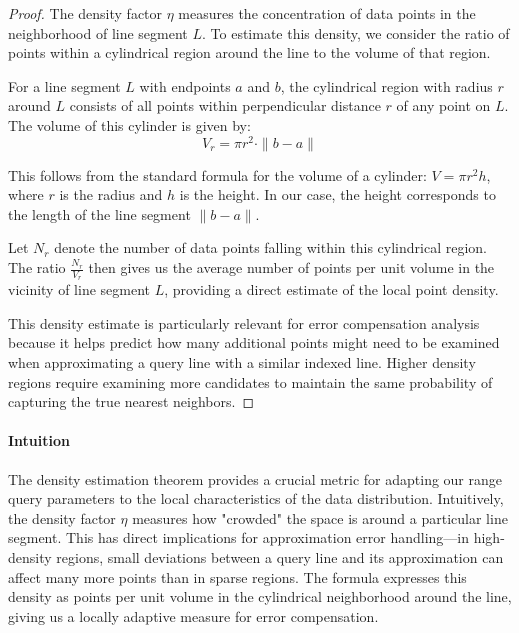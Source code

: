 \documentclass[numbers,sort]{article}
\begin{document}
\begin{proof}
The density factor $\eta$ measures the concentration of data points in the neighborhood of line segment $L$. To estimate this density, we consider the ratio of points within a cylindrical region around the line to the volume of that region.

For a line segment $L$ with endpoints $a$ and $b$, the cylindrical region with radius $r$ around $L$ consists of all points within perpendicular distance $r$ of any point on $L$. The volume of this cylinder is given by:
\begin{equation}
V_r = \pi r^2 \cdot \|b-a\|
\end{equation}

This follows from the standard formula for the volume of a cylinder: $V = \pi r^2 h$, where $r$ is the radius and $h$ is the height. In our case, the height corresponds to the length of the line segment $\|b-a\|$.

Let $N_r$ denote the number of data points falling within this cylindrical region. The ratio $\frac{N_r}{V_r}$ then gives us the average number of points per unit volume in the vicinity of line segment $L$, providing a direct estimate of the local point density.

This density estimate is particularly relevant for error compensation analysis because it helps predict how many additional points might need to be examined when approximating a query line with a similar indexed line. Higher density regions require examining more candidates to maintain the same probability of capturing the true nearest neighbors.
\end{proof}

\paragraph{Intuition} The density estimation theorem provides a crucial metric for adapting our range query parameters to the local characteristics of the data distribution. Intuitively, the density factor $\eta$ measures how "crowded" the space is around a particular line segment. This has direct implications for approximation error handling—in high-density regions, small deviations between a query line and its approximation can affect many more points than in sparse regions. The formula expresses this density as points per unit volume in the cylindrical neighborhood around the line, giving us a locally adaptive measure for error compensation.
\end{document}
